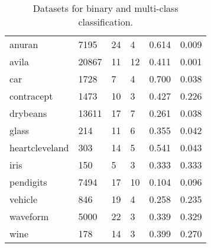 \begin{table}[ht]
\begin{tabular}{|l|ll|l|cc|}
  anuran & 7195 &   24 &    4 & 0.614 & 0.009 \\ 
  avila & 20867 &   11 &   12 & 0.411 & 0.001 \\ 
  car & 1728 &    7 &    4 & 0.700 & 0.038 \\ 
  contracept & 1473 &   10 &    3 & 0.427 & 0.226 \\ 
  drybeans & 13611 &   17 &    7 & 0.261 & 0.038 \\ 
  glass &  214 &   11 &    6 & 0.355 & 0.042 \\ 
  heartcleveland &  303 &   14 &    5 & 0.541 & 0.043 \\ 
  iris &  150 &    5 &    3 & 0.333 & 0.333 \\ 
  pendigits & 7494 &   17 &   10 & 0.104 & 0.096 \\ 
  vehicle &  846 &   19 &    4 & 0.258 & 0.235 \\ 
  waveform & 5000 &   22 &    3 & 0.339 & 0.329 \\ 
  wine &  178 &   14 &    3 & 0.399 & 0.270 \\ 
   \hline
\end{tabular}
\caption{Datasets for binary and multi-class classification.} 
\label{table:data_info}
\end{table}
